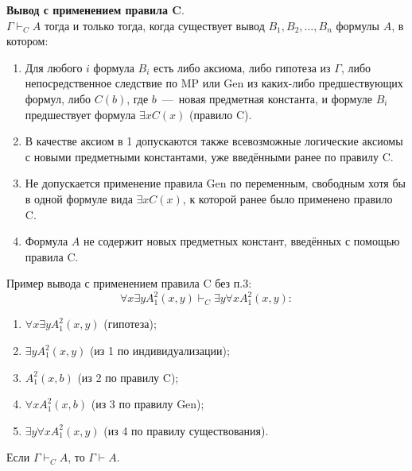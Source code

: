 \textbf{Вывод с применением правила C}. \\
$\Gamma \vdash_C A$ тогда и только тогда, когда существует вывод $B_1, B_2, \dots, B_n$ формулы $A$, в котором:
\begin{enumerate}
    \item Для любого $i$ формула $B_i$ есть либо аксиома, либо гипотеза из $\Gamma$, либо непосредственное следствие по MP или Gen из каких-либо предшествующих формул, либо $C(b)$, где $b$~---~новая предметная константа, и формуле $B_i$ предшествует формула $\exists xC(x)$ (правило C).
    \item В качестве аксиом в 1 допускаются также всевозможные логические аксиомы с новыми предметными константами, уже введёнными ранее по правилу C.
    \item Не допускается применение правила Gen по переменным, свободным хотя бы в одной формуле вида $\exists xC(x)$, к которой ранее было применено правило C.
    \item Формула $A$ не содержит новых предметных констант, введённых с помощью правила C.
\end{enumerate}
Пример вывода с применением правила C без п.3:
\[
    \forall x\exists yA_1^2(x, y) \vdash_C \exists y\forall xA_1^2(x, y):
\]
\begin{enumerate}
    \item $\forall x\exists yA_1^2(x, y)$ (гипотеза);
    \item $\exists yA_1^2(x, y)$ (из 1 по индивидуализации);
    \item $A_1^2(x, b)$ (из 2 по правилу C);
    \item $\forall xA_1^2(x, b)$ (из 3 по правилу Gen);
    \item $\exists y\forall xA_1^2(x, y)$ (из 4 по правилу существования).
\end{enumerate}
\begin{theorem}\label{th:c_rule_inference}
    Если $\Gamma \vdash_C A$, то $\Gamma \vdash A$.
\end{theorem}
